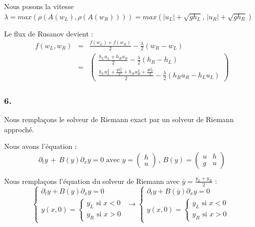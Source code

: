 \documentclass{article}
\begin{document}
Nous posons la vitesse $\lambda = max(\rho(A(w_L), \rho(A(w_R)))) = max(|u_L|+\sqrt{gh_L}, \, |u_R|+\sqrt{gh_R})$

Le flux de Rusanov devient :
\begin{eqnarray*}
    f(w_L, w_R) &=& \frac{f(w_L) + f(w_R)}{2} - \frac{\lambda}{2} (w_R - w_L) \\
    &=& \begin{pmatrix} \frac{h_L u_L + h_R u_R}{2} - \frac{\lambda}{2} (h_R-h_L) \\
                        \frac{h_L u_L^2 + \frac{g h_L^2}{2} + h_R u_R^2 + \frac{g h_R^2}{2}}{2} - \frac{\lambda}{2} (h_R u_R - h_L u_L) \end{pmatrix}
\end{eqnarray*}

\subsubsection*{6.}

Nous remplaçons le solveur de Riemann exact par un solveur de Riemann approché.

Nous avons l'équation :
\[ \partial_t y \, + \, B(y) \partial_x y = 0 \text{ avec } y = \begin{pmatrix} h \\ u \end{pmatrix} \, , \, B(y)=\begin{pmatrix} u & h \\ g & u \end{pmatrix} \]

Nous remplaçons l'équation du solveur de Riemann avec $\bar{y} = \frac{y_L+y_R}{2}$ :
\[ \left\{ \begin{matrix} \partial_t y + B(y) \partial_x y = 0 \\ y(x,0) = \left\{ \begin{matrix} y_L \text{ si } x<0 \\ y_R \text{ si } x>0 \end{matrix} \right. \end{matrix} \right.
    \longrightarrow
    \left\{ \begin{matrix} \partial_t y + B(\bar{y}) \partial_x y = 0 \\ y(x,0) = \left\{ \begin{matrix} y_L \text{ si } x<0 \\ y_R \text{ si } x>0 \end{matrix} \right. \end{matrix} \right.
\]
\end{document}
